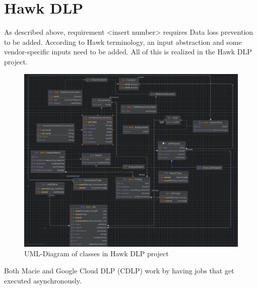 

\graphicspath{{7/figures/}}



\section{Hawk DLP}

As described above, requirement <insert number> requires Data loss prevention to be added.
According to Hawk terminology, an input abstraction and some vendor-specific inputs need to be added. All of this is realized in the Hawk DLP project. 

\begin{figure}[!htb]
  \centering

  \includegraphics[width=0.95\columnwidth]{hawk-dlp-uml.png}

  \caption[XX]{UML-Diagram of classes in Hawk DLP project}  
  \label{fig:hawk-dlp-uml}
\end{figure}

Both Macie and Google Cloud DLP (CDLP) work by having jobs that get executed asynchronously.

